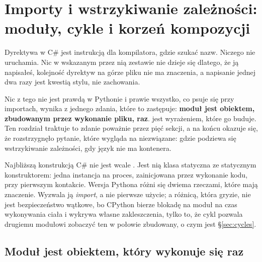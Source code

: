 
\chapter{Importy i wstrzykiwanie zależności: moduły, cykle i korzeń kompozycji}
\label{ch:imports}

\noindent
Dyrektywa  w C\# jest instrukcją dla kompilatora, gdzie szukać
nazw. Niczego nie uruchamia. Nic w wskazanym przez nią zestawie nie dzieje
się dlatego, że ją napisałeś, kolejność dyrektyw na górze pliku nie ma
znaczenia, a napisanie jednej dwa razy jest kwestią stylu, nie zachowania.

Nic z tego nie jest prawdą w Pythonie i prawie wszystko, co psuje się przy
importach, wynika z jednego zdania, które to zastępuje:
\textbf{moduł jest obiektem, zbudowanym przez wykonanie pliku, raz}.
 jest wyrażeniem, które go buduje. Ten rozdział traktuje to
zdanie poważnie przez pięć sekcji, a na końcu okazuje się, że rozstrzygnęło
pytanie, które wygląda na niezwiązane: gdzie podziewa się wstrzykiwanie
zależności, gdy język nie ma kontenera.

\begin{csbox}
Najbliższą konstrukcją C\# nie jest wcale . Jest nią klasa
statyczna ze statycznym konstruktorem: jedna instancja na proces,
zainicjowana przez wykonanie kodu, przy pierwszym kontakcie. Wersja
Pythona różni się dwiema rzeczami, które mają znaczenie. Wyzwala ją
\emph{import}, a nie pierwsze użycie; a różnicą, która gryzie, nie jest
bezpieczeństwo wątkowe, bo CPython bierze blokadę na moduł na czas
wykonywania ciała i wykrywa własne zakleszczenia, tylko to, że cykl
pozwala drugiemu modułowi zobaczyć ten w połowie zbudowany, o czym jest
\S\ref{sec:cycles}.
\end{csbox}

\section{Moduł jest obiektem, który wykonuje się raz}
\label{sec:module-object}

